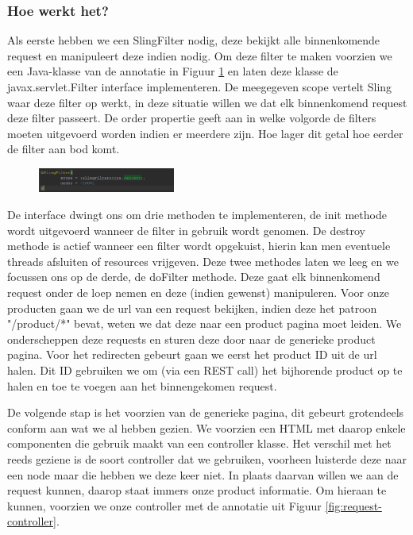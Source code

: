 \documentclass{article}
\begin{document}
	\subsubsection{Hoe werkt het?}
    Als eerste hebben we een SlingFilter nodig, deze bekijkt alle binnenkomende request en manipuleert deze indien nodig. Om deze filter te maken voorzien we een Java-klasse van de annotatie in Figuur \ref{fig:sling-filter} en laten deze klasse de javax.servlet.Filter interface implementeren. De meegegeven scope vertelt Sling waar deze filter op werkt, in deze situatie willen we dat elk binnenkomend request deze filter passeert. De order propertie geeft aan in welke volgorde de filters moeten uitgevoerd worden indien er meerdere zijn. Hoe lager dit getal hoe eerder de filter aan bod komt.
	\begin{figure}
  		\includegraphics[width=0.4\textwidth]{images/sling-filter.PNG}
  		\label{fig:sling-filter}
	\end{figure}
    De interface dwingt ons om drie methoden te implementeren, de init methode wordt uitgevoerd wanneer de filter in gebruik wordt genomen. De destroy methode is actief wanneer een filter wordt opgekuist, hierin kan men eventuele threads afsluiten of resources vrijgeven. Deze twee methodes laten we leeg en we focussen ons op de derde, de doFilter methode. Deze gaat elk binnenkomend request onder de loep nemen en deze (indien gewenst) manipuleren. Voor onze producten gaan we de url van een request bekijken, indien deze het patroon "/product/*" bevat, weten we dat deze naar een product pagina moet leiden. We onderscheppen deze requests en sturen deze door naar de generieke product pagina. Voor het redirecten gebeurt gaan we eerst het product ID uit de url halen. Dit ID gebruiken we om (via een REST call) het bijhorende product op te halen en toe te voegen aan het binnengekomen request.
    \par
    De volgende stap is het voorzien van de generieke pagina, dit gebeurt grotendeels conform aan wat we al hebben gezien. We voorzien een HTML met daarop enkele componenten die gebruik maakt van een controller klasse. Het verschil met het reeds geziene is de soort controller dat we gebruiken, voorheen luisterde deze naar een node maar die hebben we deze keer niet. In plaats daarvan willen we aan de request kunnen, daarop staat immers onze product informatie. Om hieraan te kunnen, voorzien we onze controller met de annotatie uit Figuur \ref{fig:request-controller}.
    
\end{document}
